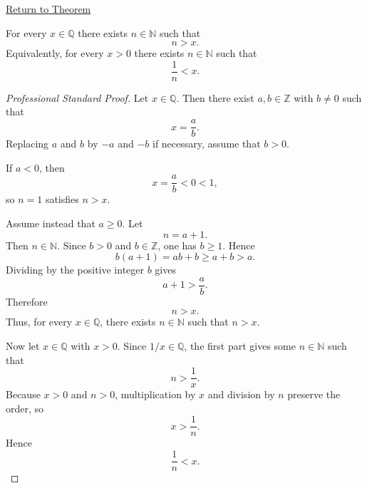 \newpage
{}
\label{prf:archimedean-q}

\begin{remark*}[Return]
\hyperref[thm:archimedean-q]{Return to Theorem}
\end{remark*}

\begin{theorem*}
For every $x\in\mathbb{Q}$ there exists $n\in\mathbb{N}$ such that
\[
n>x.
\]
Equivalently, for every $x>0$ there exists $n\in\mathbb{N}$ such that
\[
\frac{1}{n}<x.
\]
\end{theorem*}

\begin{proof}[Professional Standard Proof]
\LRAProofBodyStart
Let $x \in \mathbb{Q}$. Then there exist $a,b \in \mathbb{Z}$ with
$b \neq 0$ such that
\[
x=\frac{a}{b}.
\]
Replacing $a$ and $b$ by $-a$ and $-b$ if necessary, assume that
$b>0$.

If $a<0$, then
\[
x=\frac{a}{b}<0<1,
\]
so $n=1$ satisfies $n>x$.

Assume instead that $a\ge 0$. Let
\[
n=a+1.
\]
Then $n\in\mathbb{N}$. Since $b>0$ and $b\in\mathbb{Z}$, one has
$b\ge 1$. Hence
\[
b(a+1)=ab+b\ge a+b>a.
\]
Dividing by the positive integer $b$ gives
\[
a+1>\frac{a}{b}.
\]
Therefore
\[
n>x.
\]
Thus, for every $x\in\mathbb{Q}$, there exists $n\in\mathbb{N}$ such
that $n>x$.

Now let $x\in\mathbb{Q}$ with $x>0$. Since $1/x\in\mathbb{Q}$, the
first part gives some $n\in\mathbb{N}$ such that
\[
n>\frac{1}{x}.
\]
Because $x>0$ and $n>0$, multiplication by $x$ and division by $n$
preserve the order, so
\[
x>\frac{1}{n}.
\]
Hence
\[
\frac{1}{n}<x.
\]
\end{proof}

